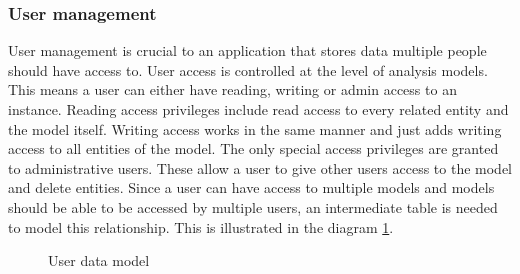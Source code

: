 \subsubsection*{User management}

User management is crucial to an application that stores data multiple people should have access to. 
User access is controlled at the level of analysis models. 
This means a user can either have reading, writing or admin access to an  instance. 
Reading access privileges include read access to every related entity and the model itself.
Writing access works in the same manner and just adds writing access to all entities of the model. 
The only special access privileges are granted to administrative users. 
These allow a user to give other users access to the model and delete entities. 
Since a user can have access to multiple models and models should be able to be accessed by multiple users, an intermediate table is needed to model this relationship. 
This is illustrated in the diagram \ref{fig:user-model}.

\begin{figure}
    \centering
    
    \caption{User data model}
    \label{fig:user-model}
    
\end{figure}

